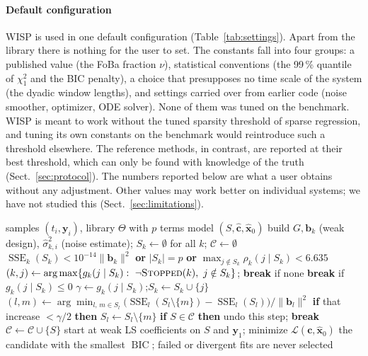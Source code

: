 \documentclass[10pt]{article}
\newcommand{\SSE}{\operatorname{SSE}}
\newcommand{\BIC}{\operatorname{BIC}}
\begin{document}
\paragraph{Default configuration}
WISP is used in one default configuration (Table~\ref{tab:settings}). Apart from the library there is nothing for the
user to set. The constants fall into four groups: a published value (the FoBa fraction $\nu$), statistical
conventions (the 99\,\% quantile of $\chi^2_1$ and the BIC penalty), a choice that presupposes no time scale of the
system (the dyadic window lengths), and settings carried over from earlier code (noise smoother, optimizer, ODE
solver). None of them was tuned on the benchmark. WISP is meant to work without the tuned sparsity threshold of sparse
regression, and tuning its own constants on the benchmark would reintroduce such a threshold elsewhere. The reference
methods, in contrast, are reported at their best threshold, which can only be found with knowledge of the truth
(Sect.~\ref{sec:protocol}). The numbers reported below are what a user obtains without any adjustment. Other values
may work better on individual systems; we have not studied this (Sect.~\ref{sec:limitations}).

\begin{algorithm}[t]
\caption{WISP. $\SSE_k$ is the weak least-squares residual of equation $k$, $g$ the normalized gain of
Eq.~\eqref{eq:gain}, $\rho_k(j\mid S)$ the gain-to-noise ratio of Eq.~\eqref{eq:stop}. Ties are broken by the smallest
equation index, then the smallest term index.}
\label{alg:path}
\small
\begin{algorithmic}[1]
\Require samples $(t_i,\bm y_i)$, library $\Theta$ with $p$ terms
\Ensure model $(S,\hat{\bm c},\hat{\bm x}_0)$
\State build $G,\bm b_k$ (weak design), $\hat\sigma^2_{k,i}$ (noise estimate); $S_k\gets\emptyset$ for all $k$; $\mathcal C\gets\emptyset$
  \State \Return $\SSE_k(S_k)<10^{-14}\lVert\bm b_k\rVert^2$ \textbf{or} $|S_k|=p$ \textbf{or} $\max_{j\notin S_k}\rho_k(j\mid S_k)<6.635$
\EndFunction
\Loop
  \State $(k,j)\gets\arg\max\{g_k(j\mid S_k):\ \neg\Call{Stopped}{k},\ j\notin S_k\}$; \textbf{break} if none
  \State \textbf{break} if $g_k(j\mid S_k)\le0$
  \State $\gamma\gets g_k(j\mid S_k)$;\quad $S_k\gets S_k\cup\{j\}$ 
  \Repeat {}
    \State $(l,m)\gets\arg\min_{l,\,m\in S_l}\big(\SSE_l(S_l\setminus\{m\})-\SSE_l(S_l)\big)/\lVert\bm b_l\rVert^2$
    \State \textbf{if} that increase $<\gamma/2$ \textbf{then} $S_l\gets S_l\setminus\{m\}$
  \State \textbf{if} $S\in\mathcal C$ \textbf{then} undo this step; \textbf{break} 
  \State $\mathcal C\gets\mathcal C\cup\{S\}$
\EndLoop
{} 
  \State start at weak LS coefficients on $S$ and $\bm y_1$; minimize $\mathcal L(\bm c,\hat{\bm x}_0)$
\EndFor
\State \Return the candidate with the smallest $\BIC$; failed or divergent fits are never selected
\end{algorithmic}
\end{algorithm}
\end{document}
